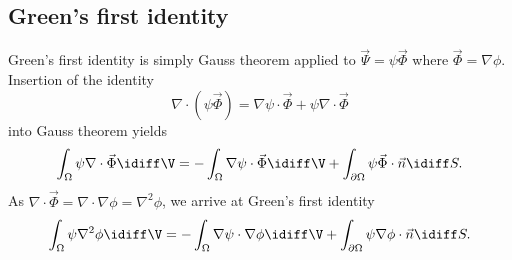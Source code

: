 \subsection{Green's first identity}
Green's first identity is simply Gauss theorem applied to $\vec{\Psi}=\psi\vec{\Phi}$ where $\vec{\Phi}=\nabla\phi$. Insertion of the identity
\begin{equation*}
	\nabla\cdot(\psi\vec{\Phi}) = \nabla\psi\cdot\vec{\Phi} + \psi\nabla\cdot\vec{\Phi}
\end{equation*}
into Gauss theorem yields
\begin{equation}
	\label{Eq2:GaussImplication2}
	\int_\Omega\psi\nabla\cdot\vec{\Phi}\idiff\V = -\int_\Omega\nabla\psi\cdot\vec{\Phi}\idiff\V + \int_{\partial\Omega} \psi\vec{\Phi}\cdot \vec{n}\idiff S.
\end{equation}
As $\nabla\cdot\vec{\Phi}=\nabla\cdot\nabla\phi=\nabla^2\phi$, we arrive at Green's first identity
\begin{equation}\label{Eq2:GreensFirstIdentity}
	\int_\Omega\psi\nabla^2\phi\idiff\V = -\int_\Omega\nabla\psi\cdot\nabla\phi\idiff\V + \int_{\partial\Omega}\psi\nabla\phi\cdot \vec{n}\idiff S.
\end{equation}
